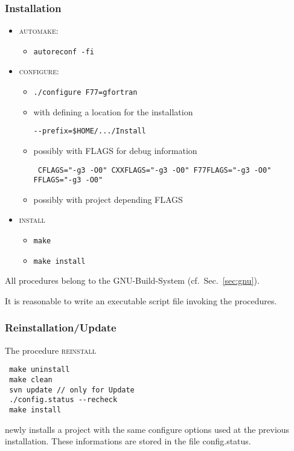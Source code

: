\subsubsection{Installation}
\begin{itemize}
	\item \textsc{automake}:
	\begin{itemize}
		\item[] \begin{verbatim}autoreconf -fi\end{verbatim}
	\end{itemize}
	\item \textsc{configure}: 
	\begin{itemize}
		\item[] \begin{verbatim}./configure F77=gfortran \end{verbatim}
        \item[] with defining a location for the installation 
                \begin{verbatim}--prefix=$HOME/.../Install\end{verbatim}
        \item[] possibly with FLAGS for debug information
		        \begin{verbatim} CFLAGS="-g3 -O0" CXXFLAGS="-g3 -O0" F77FLAGS="-g3 -O0" FFLAGS="-g3 -O0" \end{verbatim}
		\item[] possibly with project depending FLAGS
	\end{itemize}
	\item \textsc{install}
	\begin{itemize}	
		\item \begin{verbatim}make\end{verbatim}
		\item \begin{verbatim}make install\end{verbatim}
	\end{itemize}
\end{itemize}
All procedures belong to the GNU-Build-System (cf.~Sec.~\ref{sec:gnu}).\par
It is reasonable to write an executable script file invoking the procedures.

\subsubsection{Reinstallation/Update}
The procedure \textsc{reinstall}
\begin{verbatim}
 make uninstall 
 make clean
 svn update // only for Update
 ./config.status --recheck
 make install
\end{verbatim}
newly installs a project with the same configure options used at the previous installation. These informations are stored in the file config.status.\par 

